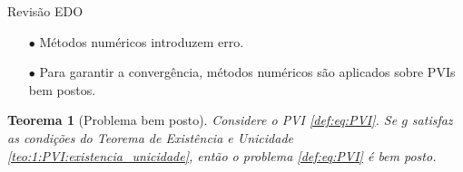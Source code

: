 \documentclass{beamer}
\theoremstyle{plain}
\newtheorem{teo}{Teorema}
\theoremstyle{definition}
\begin{document}
\begin{frame}{Revisão EDO}

    \begin{itemize}
        \item[$\bullet$] Métodos numéricos introduzem erro.
        \item[$\bullet$] Para garantir a convergência, métodos numéricos são aplicados sobre PVIs bem postos.

    \end{itemize}

    \begin{teo}[Problema bem posto]
        \label{teo:2:problema_bem_posto}
        Considere o PVI \eqref{def:eq:PVI}. Se $g$ satisfaz as condições do Teorema de Existência
        e Unicidade \ref{teo:1:PVI:existencia_unicidade}, então o problema \eqref{def:eq:PVI} é bem posto.
    \end{teo}



\end{frame}
\end{document}
